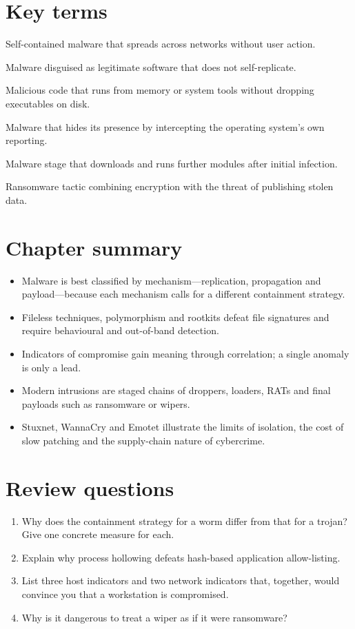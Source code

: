 \section*{Key terms}
\begin{description}[style=nextline,leftmargin=1.2em]
  \item[Worm] Self-contained malware that spreads across networks without user action.
  \item[Trojan] Malware disguised as legitimate software that does not self-replicate.
  \item[Fileless malware] Malicious code that runs from memory or system tools without dropping executables on disk.
  \item[Rootkit] Malware that hides its presence by intercepting the operating system's own reporting.
  \item[Loader] Malware stage that downloads and runs further modules after initial infection.
  \item[Double extortion] Ransomware tactic combining encryption with the threat of publishing stolen data.
\end{description}

\section*{Chapter summary}
\begin{itemize}
  \item Malware is best classified by mechanism—replication, propagation and payload—because each mechanism calls for a different containment strategy.
  \item Fileless techniques, polymorphism and rootkits defeat file signatures and require behavioural and out-of-band detection.
  \item Indicators of compromise gain meaning through correlation; a single anomaly is only a lead.
  \item Modern intrusions are staged chains of droppers, loaders, RATs and final payloads such as ransomware or wipers.
  \item Stuxnet, WannaCry and Emotet illustrate the limits of isolation, the cost of slow patching and the supply-chain nature of cybercrime.
\end{itemize}

\section*{Review questions}
\begin{enumerate}
  \item Why does the containment strategy for a worm differ from that for a trojan? Give one concrete measure for each.
  \item Explain why process hollowing defeats hash-based application allow-listing.
  \item List three host indicators and two network indicators that, together, would convince you that a workstation is compromised.
  \item Why is it dangerous to treat a wiper as if it were ransomware?
\end{enumerate}
